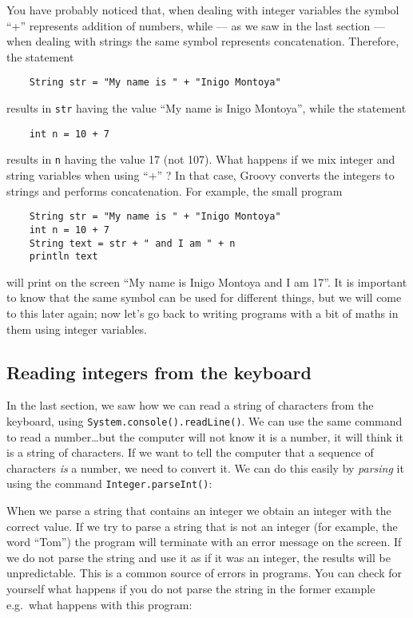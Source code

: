 You have probably noticed that, when dealing with integer
variables the symbol ``+'' represents addition of numbers, while --- as
we saw in the last section --- when dealing with strings the same
symbol represents concatenation. Therefore, the statement

\begin{Verbatim}
    String str = "My name is " + "Inigo Montoya"
\end{Verbatim}

results in \verb+str+ having the value ``My name is Inigo Montoya'',
while the statement

\begin{Verbatim}
    int n = 10 + 7
\end{Verbatim}

results in \verb+n+ having the value 17 (not 107). What happens if we
mix integer and string variables when using ``+'' ? 
In that case, Groovy converts the integers to strings and performs
concatenation. For example, the small program

\begin{Verbatim}
    String str = "My name is " + "Inigo Montoya"
    int n = 10 + 7
    String text = str + " and I am " + n
    println text
\end{Verbatim}

will print on the screen ``My name is Inigo Montoya and I am 17''. It
is important to know that the same symbol can be used for different
things, but we will come to this later again; now let's go back to
writing programs with a bit of maths in them using integer variables.

\subsection{Reading integers from the keyboard}
\label{sec:intkeyboard}

In the last section, we saw how we can read a string of characters
from the keyboard, 
using \verb+System.console().readLine()+. We can use the same command
to read a number\ldots but the computer will not know it is a number,
it will think it is a string of characters. If we want to tell the
computer that a sequence of characters \emph{is} a number, we need to convert it. 
We can do this easily by \emph{parsing} it using the command
\verb+Integer.parseInt()+: 


When we parse a string that contains an integer we obtain an integer
with the correct value. If we try to parse a string that is not an
integer (for example, the word ``Tom'') the program will terminate with an error
message on the screen. If we do not parse the string and use it as if
it was an integer, the results will be unpredictable. This
is a common source of errors in programs. You can check for yourself
what happens if you do not parse the string in the former example
e.g.\ what happens with this program:

